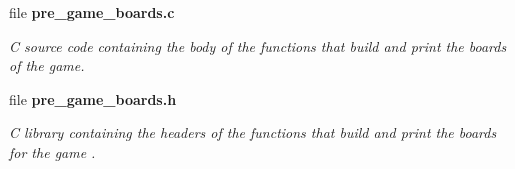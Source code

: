 \begin{DoxyCompactItemize}
file \textbf{ pre\+\_\+game\+\_\+boards.\+c}
\begin{DoxyCompactList}\small\item\em C source code containing the body of the functions that build and print the boards of the game. \end{DoxyCompactList}\item 
file \textbf{ pre\+\_\+game\+\_\+boards.\+h}
\begin{DoxyCompactList}\small\item\em C library containing the headers of the functions that build and print the boards for the game . \end{DoxyCompactList}\end{DoxyCompactItemize}
